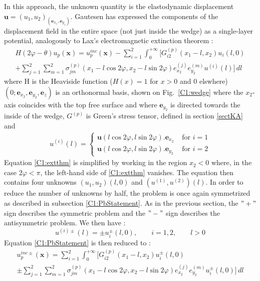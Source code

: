 In this approach, the unknown quantity is the elastodynamic displacement $\mathbf{u}=(u_1,u_2)_{(\mathbf{e}_{x_1},\mathbf{e}_{y_1})}$. Gautesen \cite{GautesenRayleigh} has expressed the components of the displacement field in the entire space (not just inside the wedge) as a single-layer potential, analogously to Lax's electromagnetic extinction theorem \cite{Lax} :
\begin{multline}
H(2\varphi-\theta)u_p(\mathbf{x})=u_p^{inc}(\mathbf{x})-\sum_{i=1}^2\int_0^{+\infty}\Big[ G_{i2}^{(p)}(x_1-l,x_2)u_i(l,0) \\
 +\sum_{j=1}^2\sum_{m=1}^2\sigma_{jm}^{(p)}(x_1-l\cos 2\varphi,x_2-l\sin 2\varphi)e_{x_2}^{(j)}e_{y_2}^{(m)}u^{(i)}(l) \Big] \, dl
 \label{C1:extthm}
\end{multline}
where H is the Heaviside function ($H(x)=1$ for $x>0$ and $0$ elswhere) $(0;\mathbf{e}_{x_2},\mathbf{e}_{y_2}, \mathbf{e}_z)$ is an orthonormal basis, shown on Fig.~\ref{C1:wedge} where the $x_2$-axis coincides with the top free surface and where $\mathbf{e}_{y_2}$ is directed towards the inside of the wedge, $G^{(p)}$ is Green's stress tensor, defined in section \ref{sectKA} and
\begin{eqnarray}
u^{(i)}(l)=
\left\{
\begin{array}{cc}
\mathbf{u}(l\cos 2\varphi,l\sin 2\varphi).\mathbf{e}_{x_2} & \mbox{ for } i=1 \\
\mathbf{u}(l\cos 2\varphi,l\sin 2\varphi).\mathbf{e}_{y_2} & \mbox{ for } i=2
\end{array}
\right.
\end{eqnarray}
Equation \eqref{C1:extthm} is simplified by working in the region $x_2<0$ where, in the case $2\varphi<\pi$, the left-hand side of \eqref{C1:extthm} vanishes. The equation then contains four unknowns $(u_1,u_2)(l,0)$ and $(u^{(1)},u^{(2)})(l)$. In order to reduce the number of unknowns by half, the problem is once again symmetrized as described in subsection \ref{C1:PbStatement}. As in the previous section, the $"+"$ sign describes the symmetric problem and the $"-"$ sign describes the antisymmetric problem. We then have :
\begin{equation}
u^{(i)\pm}(l)=\pm u_i^\pm(l,0), \hspace{2em} i=1,2, \hspace{2em} l>0
\end{equation}
Equation \eqref{C1:PbStatement} is then reduced to :
\begin{multline}
u_p^{inc \pm}(\mathbf{x})=\sum_{i=1}^2\int_0^{+\infty}\Big[ G_{i2}^{(p)}(x_1-l,x_2)u_i^\pm(l,0)\\
\pm\sum_{j=1}^2\sum_{m=1}^2\sigma_{jm}^{(p)}(x_1-l\cos 2\varphi,x_2-l\sin 2\varphi)e_{x_2}^{(j)}e_{y_2}^{(m)}u_i^\pm(l,0) \Big] \, dl
\label{C1:extthmsym}
\end{multline}
